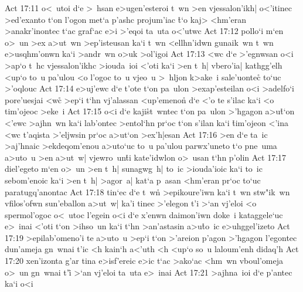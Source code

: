 \vs Act 17:11
o<~utoi
d`e
>~hsan
e>ugen'esteroi
t~wn
>en
vjessalon'ikh|
o<'itinec
>ed'exanto
t`on
l'ogon
met`a
p'ashc
projum'iac
\r{t}`o
kaj>
<hm'eran
>anakr'inontec
t`ac
graf`ac
e>i
>'eqoi
ta~uta
o<'utwc\bibvsend
\vs Act 17:12
pollo`i
m`en
o>~un
>ex
a>ut~wn
>ep'isteusan
ka`i
t~wn
<ellhn'idwn
gunaik~wn
t~wn
e>usqhm'onwn
ka`i
>andr~wn
o>uk
>ol'igoi\bibvsend
\vs Act 17:13
<wc
d`e
>'egnwsan
o<i
>ap`o
t~hc
vjessalon'ikhc
>iouda~ioi
<'oti
ka`i
>en
t~h|
vbero'ia|
kathgg'elh
<up`o
to~u
pa'ulou
<o
l'ogoc
to~u
vjeo~u
>~hljon
k>ake~i
sale'uonte\r{c}
to`uc
>'oqlouc\bibvsend
\vs Act 17:14
e>uj'ewc
d`e
t'ote
t`on
pa~ulon
>exap'esteilan
o<i
>adelfo`i
pore'uesjai
<w\r{c}
>ep`i
t`hn
vj'alassan
<up'emenon\r{}
d`e
<'o
te
s'ilac
ka`i
<o
tim'ojeoc
>eke~i\bibvsend
\vs Act 17:15
o<i
d`e
kaji\r{s}t~wntec
t`on
pa~ulon
>'hgagon
a>u\r{t}`on
<'ewc
>ajhn~wn
ka`i
lab'ontec
>entol`hn
pr`oc
t`on
s'ilan
ka`i
\r{t}im'ojeon
<'ina
<wc
t'aqista
>'eljwsin
pr`oc
a>ut`on
>ex'h|esan\bibvsend
\vs Act 17:16
>en
d`e
ta~ic
>aj'hnaic
>ekdeqom'enou
a>uto`uc
to~u
pa'ulou
parwx'uneto
t`o
pne~uma
a>uto~u
>en
a>ut~w|
vjewro~un\r{t}i
kate'idwlon
o>~usan
t`hn
p'olin\bibvsend
\vs Act 17:17
diel'egeto
m`en
o>~un
>en
t~h|
sunagwg~h|
to~ic
>iouda'ioic
ka`i
to~ic
sebom'enoic
ka`i
>en
t~h|
>agor~a|
kat`a
p~asan
<hm'eran
pr`oc
to`uc
paratugq'anontac\bibvsend
\vs Act 17:18
tin`ec
d`e
t~wn\r{}
>epikoure'iwn
ka`i
t~wn
stw"ik~wn
vfilos'ofwn
sun'eballon
a>ut~w|
ka'i
tinec
>'elegon
t'i
>`an
vj'eloi
<o
spermol'ogoc
o<~utoc
l'egein
o<i
d`e
x'enwn
daimon'iwn
doke~i
kataggele`uc
e>~inai
<'oti
t`on
>ihso~un
ka`i
t`hn
>an'astasin
a>u\r{t}o~ic
e>uhggel'izeto\bibvsend
\vs Act 17:19
>epilab'omeno'i
te
a>uto~u
>ep`i
t`on
>'areion
p'agon
>'hgagon
l'egontec
dun'ameja
gn~wnai
t'ic
<h
kain`h
a<'uth
<h
<up`o
so~u
laloum'enh
didaq'h\bibvsend
\vs Act 17:20
xen'izonta
g'ar
tina
e>isf'ereic
e>ic
t`ac
>ako`ac
<hm~wn
vboul'omeja
o>~un
gn~wnai
t'i\r{}
>`an
vj'eloi
ta~uta
e>~inai\bibvsend
\vs Act 17:21
>ajhna~ioi
d`e
p'antec
ka`i
o<i

